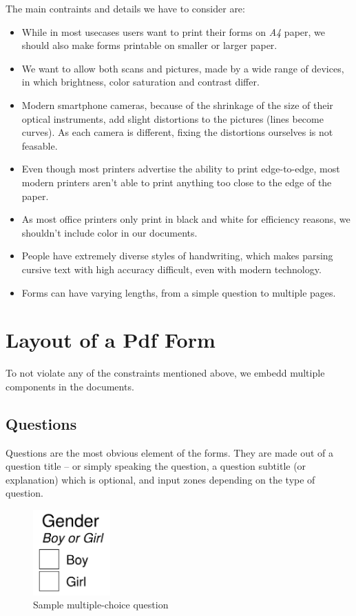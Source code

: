\documentclass[12pt, a4paper]{report}
\begin{document}
The main contraints and details we have to consider are:
\begin{itemize}
    \item While in most usecases users want to print their forms on \textit{A4} paper, we should also make forms printable on smaller or larger paper.
    \item We want to allow both scans and pictures, made by a wide range of devices, in which brightness, color saturation and contrast differ.
    \item Modern smartphone cameras, because of the shrinkage of the size of their optical instruments, add slight distortions to the pictures (lines become curves). As each camera is different, fixing the distortions ourselves is not feasable.
    \item Even though most printers advertise the ability to print edge-to-edge, most modern printers aren't able to print anything too close to the edge of the paper.
    \item As most office printers only print in black and white for efficiency reasons, we shouldn't include color in our documents.
    \item People have extremely diverse styles of handwriting, which makes parsing cursive text with high accuracy difficult, even with modern technology.
    \item Forms can have varying lengths, from a simple question to multiple pages.
\end{itemize}

\section{Layout of a Pdf Form}

To not violate any of the constraints mentioned above, we embedd multiple components in the documents.

\subsection{Questions}

Questions are the most obvious element of the forms. They are made out of a question title -- or simply speaking the question, a question subtitle (or explanation) which is optional, and input zones depending on the type of question.

\begin{figure}[!h]
    \centering
    \includegraphics[width=8em]{images/screenshoots/sample-multiple-choice-question.png}
    \caption{Sample multiple-choice question}
    \label{fig:label}
\end{figure}
\end{document}
